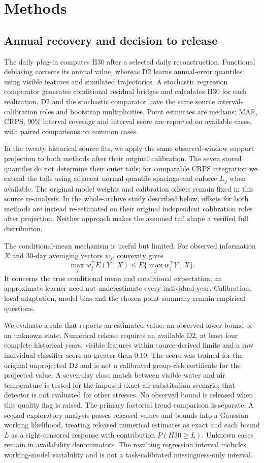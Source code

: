 \documentclass[draft,linenumbers]{agujournal2025}
\begin{document}
\section{Methods}
\subsection{Annual recovery and decision to release}
The daily plug-in computes H30 after a selected daily reconstruction. Functional debiasing corrects its annual value, whereas D2 learns annual-error quantiles using visible features and simulated trajectories. A stochastic regression comparator generates conditional residual bridges and calculates H30 for each realization. D2 and the stochastic comparator have the same source interval-calibration roles and bootstrap multiplicities. Point estimates are medians; MAE, CRPS, 90\% interval coverage and interval score are reported on available cases, with paired comparisons on common cases.

In the twenty historical source fits, we apply the same observed-window support projection to both methods after their original calibration. The seven stored quantiles do not determine their outer tails; for comparable CRPS integration we extend the tails using adjacent normal-quantile spacings and enforce $L_y$ when available. The original model weights and calibration offsets remain fixed in this source re-analysis. In the whole-archive study described below, offsets for both methods are instead re-estimated on their original independent calibration roles after projection. Neither approach makes the assumed tail shape a verified full distribution.

The conditional-mean mechanism is useful but limited. For observed information $X$ and 30-day averaging vectors $w_j$, convexity gives
\[
 \max_j w_j^\top E(Y\mid X)\le E\{\max_j w_j^\top Y\mid X\}.
\]
It concerns the true conditional mean and conditional expectation; an approximate learner need not underestimate every individual year. Calibration, local adaptation, model bias and the chosen point summary remain empirical questions.

We evaluate a rule that reports an estimated value, an observed lower bound or an unknown state. Numerical release requires an available D2, at least four complete historical years, visible features within source-derived limits and a raw individual classifier score no greater than 0.10. The score was trained for the original unprojected D2 and is not a calibrated group-risk certificate for the projected value. A seven-day close match between visible water and air temperature is tested for the imposed exact-air-substitution scenario; that detector is not evaluated for other stresses. No observed bound is released when this quality flag is raised. The primary factorial trend comparison is separate. A second exploratory analysis passes released values and bounds into a Gaussian working likelihood, treating released numerical estimates as exact and each bound $L$ as a right-censored response with contribution $P(H30\ge L)$. Unknown cases remain in availability denominators. The resulting regression interval includes working-model variability and is not a task-calibrated missingness-only interval.
\end{document}
